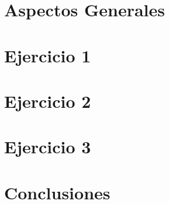 \documentclass[12pt]{extarticle}
\numberwithin{equation}{section}
\begin{document}



\section{Aspectos Generales}



\section{Ejercicio 1}



\section{Ejercicio 2}



\section{Ejercicio 3}



\section{Conclusiones}


\end{document}

